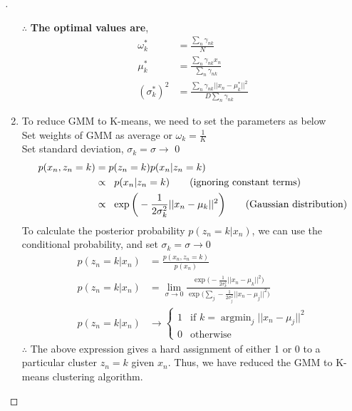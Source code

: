 \documentclass[a4paper, 12pt]{article}
\DeclareMathOperator*{\argmin}{argmin}
\begin{document}
\begin{proof}[]
\begin{enumerate}[label={\color{blue}{\textbf{1.\arabic*})}}]
        $\therefore$ \textbf{The optimal values are}, 
        \begin{align*}
            \omega_k^* &= \frac{\textstyle\sum_n\gamma_{nk}}{N}\\
            \mu_k^* &= \frac{\textstyle
            \sum\nolimits_n{\gamma_{nk}x_n}}{\sum\nolimits_n{\gamma_{nk}}}\\
            (\sigma_k^*)^2 &= \frac{\sum\nolimits_n\gamma_{nk}||x_n - \mu_k^*||^2}{D\sum\nolimits_n\gamma_{nk}}
        \end{align*}
    \item 
        To reduce GMM to K-means, we need to set the parameters as below\\
        Set weights of GMM as average or $\omega_k = \frac{1}{K}$ \\
        Set standard deviation, $\sigma_k = \sigma \to $ 0
        \begin{align*}
            p(x_n, z_n = k) &= p(z_n = k) p(x_n | z_n = k)\\
            &\propto \;\;p(x_n | z_n = k){\tag*{(ignoring constant terms)}}\\
            &\propto \;\; \exp{\bigg(  -\frac{1}{2\sigma_k^2} || x_n - \mu_k ||^2 \bigg)}{\tag*{(Gaussian distribution)}}
        \end{align*}
        To calculate the posterior probability $p(z_n = k | x_n)$, we can use the conditional probability, and set $\sigma_k = \sigma \to 0$
        \begin{align*}
            p(z_n = k | x_n) &= \frac{p(x_n, z_n = k)}{p(x_n)}\\
            p(z_n = k | x_n) &= \lim_{\sigma \to 0}\frac{\exp{\big( -\frac{1}{2\sigma_k^2} || x_n - \mu_k ||^2 \big)}}{\exp{\big( \sum\nolimits_j -\frac{1}{2\sigma_j^2} || x_n - \mu_j ||^2 \big)}}\\
            p(z_n = k | x_n) &\to \begin{cases} 
              1 & \text{if $k = \argmin_j ||x_n - \mu_j||^2$} \\
              0 & \text{otherwise}
           \end{cases}
        \end{align*}
        $\therefore$ The above expression gives a hard assignment of either 1 or 0 to a particular cluster $z_n = k$ given $x_n$. Thus, we have reduced the GMM to K-means clustering algorithm.
\end{enumerate}
\end{proof}
\end{document}
